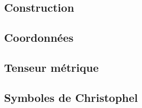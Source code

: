 

\subsection{Construction}

\subsection{Coordonnées}

\subsection{Tenseur métrique}

\subsection{Symboles de Christophel}